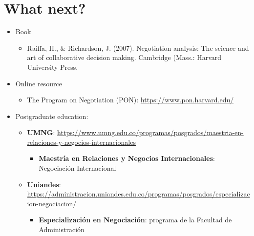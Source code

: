 \documentclass[
  ignorenonframetext,
]{beamer}
\providecommand{\tightlist}{%
  \setlength{\itemsep}{0pt}\setlength{\parskip}{0pt}}\usepackage{longtable,booktabs,array}
\begin{document}
\section{What next?}\label{what-next}

\begin{frame}{}
\label{section-13}
\begin{itemize}
\item
  Book

  \begin{itemize}
  \tightlist
  \item
    Raiffa, H., \& Richardson, J. (2007). Negotiation analysis: The
    science and art of collaborative decision making. Cambridge (Mass.:
    Harvard University Press.
  \end{itemize}
\item
  Online resource

  \begin{itemize}
  \tightlist
  \item
    The Program on Negotiation (PON): \url{https://www.pon.harvard.edu/}
  \end{itemize}
\end{itemize}
\end{frame}

\begin{frame}{}
\label{section-14}
\begin{itemize}
\item
  Postgraduate education:

  \begin{itemize}
  \item
    \textbf{UMNG}:
    \url{https://www.umng.edu.co/programas/posgrados/maestria-en-relaciones-y-negocios-internacionales}

    \begin{itemize}
    \tightlist
    \item
      \textbf{Maestría en Relaciones y Negocios Internacionales}:
      Negociación Internacional
    \end{itemize}
  \item
    \textbf{Uniandes}:
    \url{https://administracion.uniandes.edu.co/programas/posgrados/especializacion-negociacion/}

    \begin{itemize}
    \tightlist
    \item
      \textbf{Especialización en Negociación}: programa de la Facultad
      de Administración
    \end{itemize}
  \end{itemize}
\end{itemize}
\end{frame}
\end{document}
